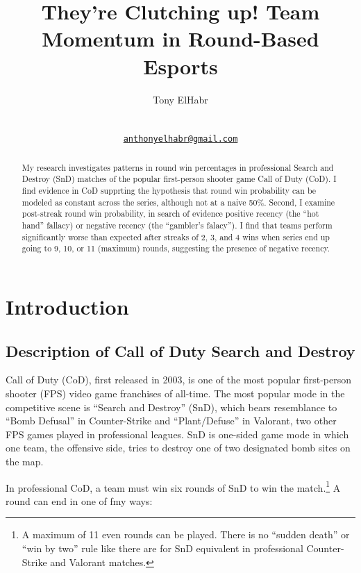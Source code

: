 \documentclass{article}
\title{They're Clutching up! Team Momentum in Round-Based Esports}
\author{
    Tony ElHabr
   \\
     \\
   \\
  \texttt{\href{mailto:anthonyelhabr@gmail.com}{\nolinkurl{anthonyelhabr@gmail.com}}} \\
  }
\begin{document}
\maketitle


\begin{abstract}
My research investigates patterns in round win percentages in
professional Search and Destroy (SnD) matches of the popular
first-person shooter game Call of Duty (CoD). I find evidence in CoD
supprting the hypothesis that round win probability can be modeled as
constant across the series, although not at a naive 50\%. Second, I
examine post-streak round win probability, in search of evidence
positive recency (the ``hot hand'' fallacy) or negative recency (the
``gambler's falacy''). I find that teams perform significantly worse
than expected after streaks of 2, 3, and 4 wins when series end up going
to 9, 10, or 11 (maximum) rounds, suggesting the presence of negative
recency.
\end{abstract}


\hypertarget{introduction}{%
\section{Introduction}\label{introduction}}

\hypertarget{description-of-call-of-duty-search-and-destroy}{%
\subsection{Description of Call of Duty Search and
Destroy}\label{description-of-call-of-duty-search-and-destroy}}

Call of Duty (CoD), first released in 2003, is one of the most popular
first-person shooter (FPS) video game franchises of all-time. The most
popular mode in the competitive scene is ``Search and Destroy'' (SnD),
which bears resemblance to ``Bomb Defusal'' in Counter-Strike and
``Plant/Defuse'' in Valorant, two other FPS games played in professional
leagues. SnD is one-sided game mode in which one team, the offensive
side, tries to destroy one of two designated bomb sites on the map.

In professional CoD, a team must win six rounds of SnD to win the
match.\footnote{A maximum of 11 even rounds can be played. There is no
  ``sudden death'' or ``win by two'' rule like there are for SnD
  equivalent in professional Counter-Strike and Valorant matches.} A
round can end in one of fmy ways:
\end{document}
